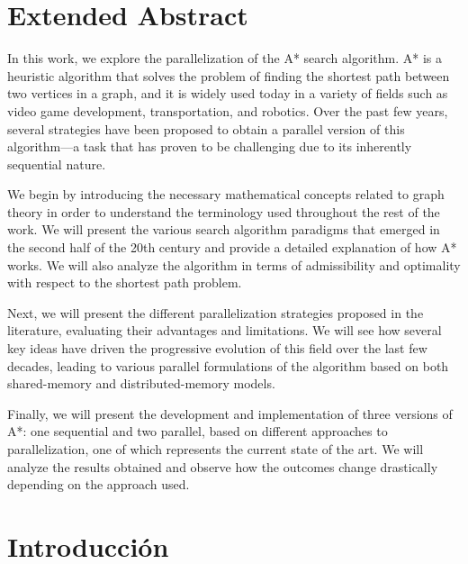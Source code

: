 \documentclass[a4paper,12pt]{article}
\begin{document}
\section*{Extended Abstract}
\thispagestyle{empty}

In this work, we explore the parallelization of the A* search algorithm. A* is a heuristic algorithm that solves the problem of finding the shortest path between two vertices in a graph, and it is widely used today in a variety of fields such as video game development, transportation, and robotics. Over the past few years, several strategies have been proposed to obtain a parallel version of this algorithm—a task that has proven to be challenging due to its inherently sequential nature.

We begin by introducing the necessary mathematical concepts related to graph theory in order to understand the terminology used throughout the rest of the work. We will present the various search algorithm paradigms that emerged in the second half of the 20th century and provide a detailed explanation of how A* works. We will also analyze the algorithm in terms of admissibility and optimality with respect to the shortest path problem.

Next, we will present the different parallelization strategies proposed in the literature, evaluating their advantages and limitations. We will see how several key ideas have driven the progressive evolution of this field over the last few decades, leading to various parallel formulations of the algorithm based on both shared-memory and distributed-memory models.

Finally, we will present the development and implementation of three versions of A*: one sequential and two parallel, based on different approaches to parallelization, one of which represents the current state of the art. We will analyze the results obtained and observe how the outcomes change drastically depending on the approach used.

\newpage

\tableofcontents
\thispagestyle{empty}

\newpage

\section{Introducción} \label{sec:introduccion}
\end{document}
